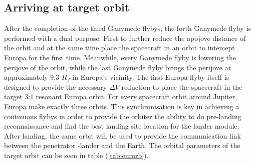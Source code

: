 \subsection{Arriving at target orbit}
After the completion of the third Ganymede flybys, the forth Ganymede flyby is performed with a dual purpose. First to further reduce the apojove distance of the orbit and at the same time place the spacecraft in an orbit to intercept Europa for the first time. Meanwhile, every Ganymede flyby is lowering the perijove of the orbit, while the last Ganymede flyby brings the perijove at approximately 9.3 $R_J$ in Europa's vicinity. The first Europa flyby itself is designed to provide the necessary $\Delta V$ reduction to place the spacecraft in the target 3:1 resonant Europa orbit. For every spacecraft orbit around Jupiter, Europa make exactly three orbits. This synchronisation is key in achieving a continuous flybys in order to provide the orbiter the ability to do pre-landing reconnaissance and find the best landing site location for the lander module. After landing, the same orbit will be used to provide the communication link between the penetrator -lander and the Earth. The orbital parameters of the target orbit can be seen in table (\ref{tab:eurorb}).

